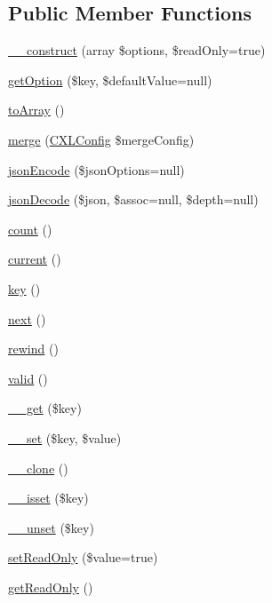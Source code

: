 \subsection*{Public Member Functions}
\begin{DoxyCompactItemize}
\item 
\hyperlink{classCXLConfig_a640283437f08aeb7c8bfe3cff738ec62}{\_\-\_\-construct} (array \$options, \$readOnly=true)
\item 
\hyperlink{classCXLConfig_aeeefab349db1835b9112b2767a0e039f}{getOption} (\$key, \$defaultValue=null)
\item 
\hyperlink{classCXLConfig_a658defb34762c8f40085aec87e16ba1a}{toArray} ()
\item 
\hyperlink{classCXLConfig_ab9e377585a59a89d463ba4b326b9feeb}{merge} (\hyperlink{classCXLConfig}{CXLConfig} \$mergeConfig)
\item 
\hyperlink{classCXLConfig_ae83de6b0e7c9ae14e4d50feff32965d0}{jsonEncode} (\$jsonOptions=null)
\item 
\hyperlink{classCXLConfig_ae3d6137f5700365c276d235463218c16}{jsonDecode} (\$json, \$assoc=null, \$depth=null)
\item 
\hyperlink{classCXLConfig_ac751e87b3d4c4bf2feb03bee8b092755}{count} ()
\item 
\hyperlink{classCXLConfig_af343507d1926e6ecf964625d41db528c}{current} ()
\item 
\hyperlink{classCXLConfig_a729e946b4ef600e71740113c6d4332c0}{key} ()
\item 
\hyperlink{classCXLConfig_acea62048bfee7b3cd80ed446c86fb78a}{next} ()
\item 
\hyperlink{classCXLConfig_ae619dcf2218c21549cb65d875bbc6c9c}{rewind} ()
\item 
\hyperlink{classCXLConfig_abb9f0d6adf1eb9b3b55712056861a247}{valid} ()
\item 
\hyperlink{classCXLConfig_a4537dad3b44254124991341cc91b28fb}{\_\-\_\-get} (\$key)
\item 
\hyperlink{classCXLConfig_a79b36d71c6f1d4f9e6c4c3e34c081456}{\_\-\_\-set} (\$key, \$value)
\item 
\hyperlink{classCXLConfig_ad0cb87b388bc74d63dc884accdca8713}{\_\-\_\-clone} ()
\item 
\hyperlink{classCXLConfig_ae858fed7cd2822fbceac154138b68baa}{\_\-\_\-isset} (\$key)
\item 
\hyperlink{classCXLConfig_a41af7dd29c879b4c30978876ebdf4ba7}{\_\-\_\-unset} (\$key)
\item 
\hyperlink{classCXLConfig_a23fafcde24c2b4b751b606686bcd50a7}{setReadOnly} (\$value=true)
\item 
\hyperlink{classCXLConfig_a40e73c679f1c56024ba565a5119436f7}{getReadOnly} ()
\end{DoxyCompactItemize}
